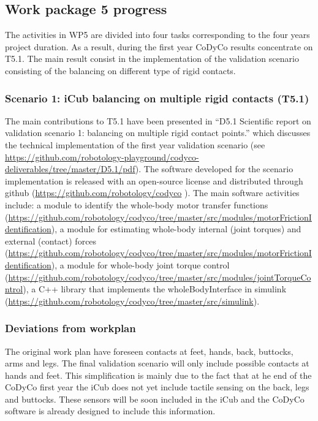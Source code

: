 \documentclass[12pt,a4paper,twoside]{article}
\begin{document}
\subsection{Work package 5 progress}

The activities in WP5 are divided into four tasks corresponding to the four years project duration. As a result, during the first year CoDyCo results concentrate on T5.1. The main result consist in the implementation of the validation scenario consisting of the balancing on different type of rigid contacts.

\subsubsection{Scenario 1: iCub balancing on multiple rigid contacts (T5.1)}

The main contributions to T5.1 have been presented in ``D5.1 Scientific report on validation scenario 1: balancing on multiple rigid contact points.'' which discusses the technical implementation of the first year validation scenario (see \url{https://github.com/robotology-playground/codyco-deliverables/tree/master/D5.1/pdf}). The software developed for the scenario implementation is released with an open-source license and distributed through github (\url{https://github.com/robotology/codyco} ). The main software activities include: a module to identify the whole-body motor transfer functions (\url{https://github.com/robotology/codyco/tree/master/src/modules/motorFrictionIdentification}), a module for estimating whole-body internal (joint torques) and external (contact) forces (\url{https://github.com/robotology/codyco/tree/master/src/modules/motorFrictionIdentification}), a module for whole-body joint torque control (\url{https://github.com/robotology/codyco/tree/master/src/modules/jointTorqueControl}), a C++ library that implements the wholeBodyInterface in simulink (\url{https://github.com/robotology/codyco/tree/master/src/simulink}).

\subsubsection{Deviations from workplan}  

The original work plan have foreseen contacts at feet, hands, back, buttocks, arms and legs. The final validation scenario will only include possible contacts at hands and feet. This simplification is mainly due to the fact that at he end of the CoDyCo first year the iCub does not yet include tactile sensing on the back, legs and buttocks. These sensors will be soon included in the iCub and the CoDyCo software is already designed to include this information. 
\end{document}
